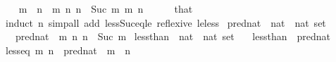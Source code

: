 \begin{isabellebody}
\isanewline
\ \ \isamarkupfalse%
\ {\isachardoublequoteopen}m\ {\isacharless}{\kern0pt}\ n{\isachardoublequoteclose}\ \ {\isachardoublequoteopen}{\isacharparenleft}{\kern0pt}{\isasymlambda}m\ n{\isachardot}{\kern0pt}\ n\ {\isacharequal}{\kern0pt}\ Suc\ m{\isacharparenright}{\kern0pt}\isactrlsup {\isacharplus}{\kern0pt}\isactrlsup {\isacharplus}{\kern0pt}\ m\ n{\isachardoublequoteclose}\isanewline
\ \ \ \ \isamarkupfalse%
\ that\ \isamarkupfalse%
\ {\isacharparenleft}{\kern0pt}induct\ n{\isacharparenright}{\kern0pt}\ {\isacharparenleft}{\kern0pt}simp{\isacharunderscore}{\kern0pt}all\ add{\isacharcolon}{\kern0pt}\ less{\isacharunderscore}{\kern0pt}Suc{\isacharunderscore}{\kern0pt}eq{\isacharunderscore}{\kern0pt}le\ reflexive\ le{\isacharunderscore}{\kern0pt}less{\isacharparenright}{\kern0pt}\isanewline
{}\isamarkupfalse%
%
\endisatagproof
{\isafoldproof}%
%
\isadelimproof
\isanewline
%
\endisadelimproof
\isanewline
{}\isamarkupfalse%
\ pred{\isacharunderscore}{\kern0pt}nat\ {\isacharcolon}{\kern0pt}{\isacharcolon}{\kern0pt}\ {\isachardoublequoteopen}{\isacharparenleft}{\kern0pt}nat\ {\isasymtimes}\ nat{\isacharparenright}{\kern0pt}\ set{\isachardoublequoteclose}\isanewline
\ \ \ {\isachardoublequoteopen}pred{\isacharunderscore}{\kern0pt}nat\ {\isacharequal}{\kern0pt}\ {\isacharbraceleft}{\kern0pt}{\isacharparenleft}{\kern0pt}m{\isacharcomma}{\kern0pt}\ n{\isacharparenright}{\kern0pt}{\isachardot}{\kern0pt}\ n\ {\isacharequal}{\kern0pt}\ Suc\ m{\isacharbraceright}{\kern0pt}{\isachardoublequoteclose}\isanewline
\isanewline
{}\isamarkupfalse%
\ less{\isacharunderscore}{\kern0pt}than\ {\isacharcolon}{\kern0pt}{\isacharcolon}{\kern0pt}\ {\isachardoublequoteopen}{\isacharparenleft}{\kern0pt}nat\ {\isasymtimes}\ nat{\isacharparenright}{\kern0pt}\ set{\isachardoublequoteclose}\isanewline
\ \ \ {\isachardoublequoteopen}less{\isacharunderscore}{\kern0pt}than\ {\isacharequal}{\kern0pt}\ pred{\isacharunderscore}{\kern0pt}nat\isactrlsup {\isacharplus}{\kern0pt}{\isachardoublequoteclose}\isanewline
\isanewline
{}\isamarkupfalse%
\ less{\isacharunderscore}{\kern0pt}eq{\isacharcolon}{\kern0pt}\ {\isachardoublequoteopen}{\isacharparenleft}{\kern0pt}m{\isacharcomma}{\kern0pt}\ n{\isacharparenright}{\kern0pt}\ {\isasymin}\ pred{\isacharunderscore}{\kern0pt}nat\isactrlsup {\isacharplus}{\kern0pt}\ {\isasymlongleftrightarrow}\ m\ {\isacharless}{\kern0pt}\ n{\isachardoublequoteclose}\isanewline
%
\isadelimproof

\end{isabellebody}
